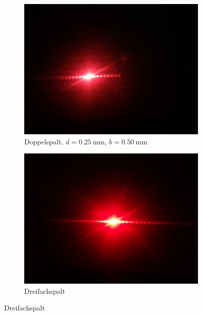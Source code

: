 \documentclass[ngerman, parskip*]{scrartcl}
\begin{document}
\begin{figure}
\centering
        \begin{subfigure}[!h]{0.49\textwidth}
          \centering
          \includegraphics[width=\textwidth,natwidth=2560,natheight=1920]{Bilder/Doppelspalt_1.jpg}
          \caption{Doppelspalt, $d = \SI{0,25}{\mm}$, $b = \SI{0,50}{\mm}$}
        \end{subfigure}
        \begin{subfigure}[!h]{0.49\textwidth}
          \centering
          \includegraphics[width=\textwidth,natwidth=2560,natheight=1920]{Bilder/Dreifachspalt.jpg}
          \caption{Dreifachspalt}
        \end{subfigure}
\end{figure}
\end{document}
